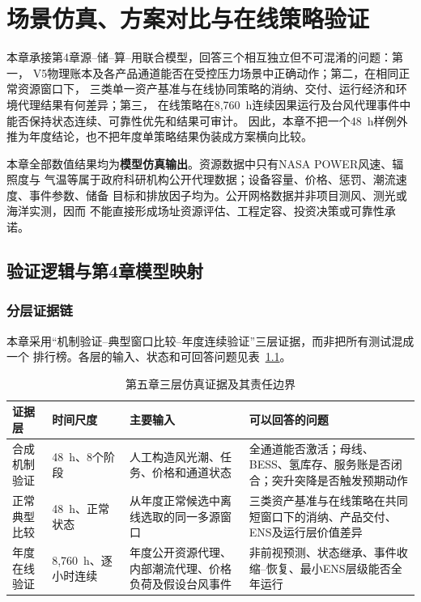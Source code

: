\chapter{场景仿真、方案对比与在线策略验证}
\label{chap:simulation}

本章承接第4章源--储--算--用联合模型，回答三个相互独立但不可混淆的问题：第一，
V5物理账本及各产品通道能否在受控压力场景中正确动作；第二，在相同正常资源窗口下，
三类单一资产基准与在线协同策略的消纳、交付、运行经济和环境代理结果有何差异；第三，
在线策略在8,760~h连续因果运行及台风代理事件中能否保持状态连续、可靠性优先和结果可审计。
因此，本章不把一个48~h样例外推为年度结论，也不把年度单策略结果伪装成方案横向比较。

本章全部数值结果均为\textbf{模型仿真输出}。资源数据中只有NASA POWER风速、辐照度与
气温等属于政府科研机构公开代理数据；设备容量、价格、惩罚、潮流速度、事件参数、储备
目标和排放因子均为\assumptiontag。公开网格数据并非项目测风、测光或海洋实测，因而
不能直接形成场址资源评估、工程定容、投资决策或可靠性承诺。

\section{验证逻辑与第4章模型映射}

\subsection{分层证据链}

本章采用“机制验证--典型窗口比较--年度连续验证”三层证据，而非把所有测试混成一个
排行榜。各层的输入、状态和可回答问题见表~\ref{tab:c5-evidence-levels}。

\begin{table}[htbp]
\centering
\caption{第五章三层仿真证据及其责任边界}
\label{tab:c5-evidence-levels}
\begin{tabularx}{\textwidth}{p{2.5cm}p{2.6cm}p{3.3cm}X}
\toprule
证据层 & 时间尺度 & 主要输入 & 可以回答的问题\\
\midrule
合成机制验证 & 48~h、8个阶段 & 人工构造风光潮、任务、价格和通道状态 & 全通道能否激活；母线、BESS、氢库存、服务账是否闭合；突升突降是否触发预期动作\\
正常典型比较 & 48~h、正常状态 & 从年度正常候选中离线选取的同一多源窗口 & 三类资产基准与在线策略在共同短窗口下的消纳、产品交付、ENS及运行层价值差异\\
年度在线验证 & 8,760~h、逐小时连续 & 年度公开资源代理、内部潮流代理、价格负荷及假设台风事件 & 非前视预测、状态继承、事件收缩--恢复、最小ENS层级能否全年运行\\
\bottomrule
\end{tabularx}
\end{table}

